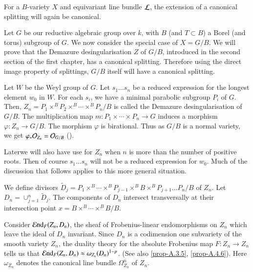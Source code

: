 \begin{remark}\label{chap4-rem4.3.12}
For a $B$-variety $X$ and equivariant line bundle $\mathcal{L}$, the extension
of a canonical splitting will again be canonical.
\end{remark}

Let $G$ be our reductive algebraic group over $k$, with $B$ (and
$T\subset B$) a Borel (and torus) subgroup of $G$. We now consider the
special case of $X=G/B$. We will prove that the Demazure
desingularisation $Z$ of $G/B$, introduced in the second section of
the first chapter, has a canonical splitting. Therefore using the
direct image property of splittings, $G/B$ itself will have a
canonical splitting.

Let $W$ be the Weyl group of $G$. Let $s_{1}\ldots s_{n}$ be a reduced
expression for the longest element $w_{0}$ in $W$. For each $s_{i}$,
we have a minimal parabolic subgroup $P_{i}$ of $G$. Then,
$Z_{n}=P_{1}\times^{B}P_{2}\times^{B}\cdots\times^{B}P_{n}/B$ is
called the Demazure desingularisation of $G/B$. The multiplication map
$m:P_{1}\times\cdots\times P_{n}\to G$ induces a morphism
$\varphi:Z_{n}\to G/B$. The morphism $\varphi$ is birational. Thus as
$G/B$ is a normal variety, we get $\varphi_{\ast}\mathcal{O}_{Z_{n}}=\mathcal{O}_{G/B}$
(\cite[II Lemma 14.5]{key11}).

\begin{remark}\label{chap4-rem4.3.13}
Later\pageoriginale we\label{page44} will also have use for $Z_{n}$ when $n$ is more
than the number of positive roots. Then of course $s_{1}\ldots s_{n}$
will not be a reduced expression for $w_{0}$. Much of the discussion
that follows applies to this more general situation.
\end{remark}

We define divisors
$\tilde{D}_{j}=P_{1}\times^{B}\cdots\times^{B}P_{j-1}\times^{B}B\times^{B}P_{j+1}\ldots
P_{n}/B$ of $Z_{n}$. Let $D_{n}=\cup^{n}_{j=1}\tilde{D}_{j}$. The
components of $D_{n}$ intersect transversally at their intersection
point $x=B\times^{B}\cdots\times^{B}B/B$.

Consider $\operatorname{\mathcal{E}nd}_{F}(Z_{n},D_{n})$, the sheaf of Frobenius-linear
endomorphi\-sms on $Z_{n}$ which leave the ideal of $D_{n}$
invariant. Since $D_{n}$ is a codimension one subvariety of the smooth
variety $Z_{n}$, the duality theory for the absolute Frobenius map
$F:Z_{n}\to Z_{n}$ tells us that $\operatorname{\mathcal{E}nd}_{F}(Z_{n},D_{n})\approx
\omega_{Z_{n}}(D_{n})^{1-p}$. (See also \ref{prop-A.3.5}, \ref{prop-A.4.6}). Here
$\omega_{Z_{n}}$ denotes the canonical line 
bundle
$\Omega^{n}_{Z_{n}}$ of $Z_{n}$.

